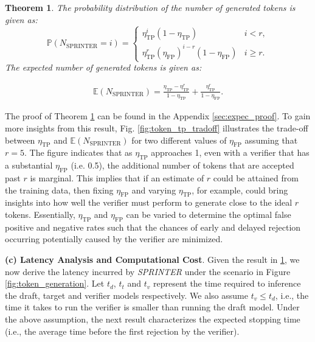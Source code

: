 \documentclass{article}
\theoremstyle{plain}
\newtheorem{theorem}{Theorem}[section]
\theoremstyle{definition}
\theoremstyle{remark}
\begin{document}
\begin{theorem}\label{the:SPRINTER_expected_tokens}
    The probability distribution of the number of generated tokens is given as: 
    \[
\mathbb{P}(N_\text{SPRINTER}=i) =
\begin{cases}
\eta_\text{TP}^{i} (1-\eta_\text{TP}) & i < r, \\
\eta_\text{TP}^r(\eta_\text{FP})^{i-r}(1-\eta_\text{FP}) & i\geq r.
\end{cases}
\]
The expected number of generated tokens is given as:

    \begin{align}
\label{eq:SPRINT_EXP_TOKEN}
        \mathbb{E}(N_\text{SPRINTER})=       \frac{\eta_\text{TP}-\eta_\text{TP}^r}{1-\eta_\text{TP}} + \frac{\eta_\text{TP}^r}{1-\eta_\text{FP}}.
        \end{align}
\end{theorem}

The proof of Theorem \ref{the:SPRINTER_expected_tokens} can be found in the Appendix \ref{sec:expec_proof}. To gain more insights from this result, Fig. \ref{fig:token_tp_tradoff} illustrates the trade-off between $\eta_\text{TP}$ and $\mathbb{E}(N_\text{SPRINTER})$ for two different values of $\eta_\text{FP}$ assuming that $r = 5$. The figure indicates that as $\eta_\text{TP}$ approaches 1,  even with a verifier that has a substantial $\eta_\text{FP}$ (i.e. 0.5), the additional number of tokens that are accepted past $r$ is marginal. This implies that if an estimate of $r$ could be attained from the training data, then fixing $\eta_\text{FP}$ and varying $\eta_\text{TP}$, for example, could bring insights into how well the verifier must perform to generate close to the ideal $r$ tokens. Essentially, $\eta_\text{TP}$ and $\eta_\text{FP}$ can be varied to determine the optimal false positive and negative rates such that the chances of early and delayed rejection occurring potentially caused by the verifier are minimized. %


\textbf{(c) Latency Analysis and Computational Cost}. 
Given the result in \ref{the:SPRINTER_expected_tokens}, we now derive the latency incurred by \textit{SPRINTER} under the scenario in Figure \ref{fig:token_generation}. Let $t_d$, $t_t$ and $t_v$ represent the time required to inference the draft, target and verifier models respectively. We also assume  $t_v \leq t_d$, i.e., the time it takes to run the verifier is smaller than running the draft model. Under the above assumption, the next result characterizes the expected stopping time (i.e., the average time before the first rejection by the verifier). 
\end{document}
